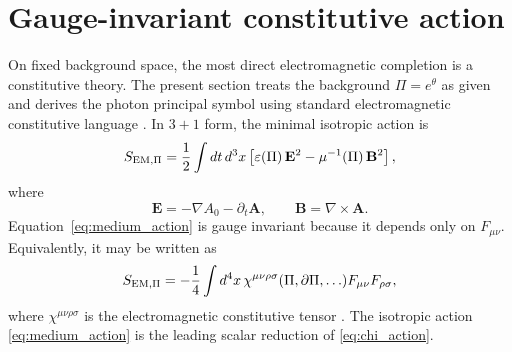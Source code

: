 \documentclass[12pt]{article}
\begin{document}
\section{Gauge-invariant constitutive action}
\label{sec:constitutive}

On fixed background space, the most direct electromagnetic completion is a constitutive theory.  The present section treats the background $\Pi=e^\theta$ as given and derives the photon principal symbol using standard electromagnetic constitutive language \cite{Jackson1999,BornWolf1999}.  In $3+1$ form, the minimal isotropic action is
\begin{equation}
 S_{\rm EM,\Pi}
 =\frac12\int dt\,d^3x
 \left[
   \varepsilon(\Pi)\,\mathbf E^2
  -\mu^{-1}(\Pi)\,\mathbf B^2
 \right],
\label{eq:medium_action}
\end{equation}
where
\begin{equation}
 \mathbf E=-\nabla A_0-\partial_t\mathbf A,
 \qquad
 \mathbf B=\nabla\times\mathbf A.
\label{eq:EB_def}
\end{equation}
Equation~\eqref{eq:medium_action} is gauge invariant because it depends only on $F_{\mu\nu}$.  Equivalently, it may be written as
\begin{equation}
 S_{\rm EM,\Pi}=-\frac14\int d^4x\,
 \chi^{\mu\nu\rho\sigma}(\Pi,\partial\Pi,\ldots)
 F_{\mu\nu}F_{\rho\sigma},
\label{eq:chi_action}
\end{equation}
where $\chi^{\mu\nu\rho\sigma}$ is the electromagnetic constitutive tensor \cite{HehlObukhov2003,Rubilar2002}.  The isotropic action \eqref{eq:medium_action} is the leading scalar reduction of \eqref{eq:chi_action}.
\end{document}
